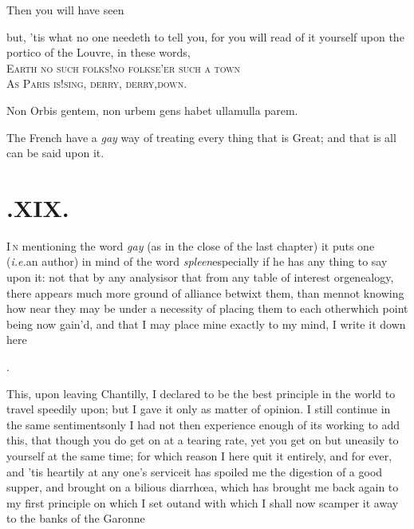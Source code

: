 \documentclass{article}
\begin{document}
\tsh Then you will have seen\tsh

\tsh but, ’tis what no one needeth to tell you,
for you will read of it yourself upon the portico of the
Louvre, in these words,\\[3pt]
\lower-3pt\hbox{\ast} \textsc{Earth no such folks!\tsk no folks\bnq\quad e’er such a
town}\\[2pt]
\textsc{As Paris is!\tsk sing, derry, derry,\bnq\quad down}.

\bgroup\footnotesize
\noindent\lower-3pt\hbox{\ast} Non Orbis gentem, non urbem gens habet
ullam\bnq\qquad\tsh\tsh\tsh\tsh ulla parem.
\par\egroup
\etp{}
\newpage
\noindent
The French have a \textit{gay} way of treating every thing
that is Great; and that is all can be said upon it.



\section{.\enspace XIX.}

\lettrine{I}{\,n} mentioning the word \textit{gay} (as
in the close of the last chapter) it puts one (\textit{i.e.}\@ an
author) in mind of the word \textit{spleen}\tsh especially
if he has any thing to say upon it: not that by any
analysis\break\tsk or that from any table of interest or\break genealogy,
there appears much more ground of alliance betwixt them, than
\break
men\tsk not knowing how near they may be
under a necessity of placing them to each other\tsh which
point being now gain’d, and that I may place mine exactly to
my mind, I write it down here\tsh

\bigskip
\centerline{.}

This, upon leaving Chantilly, I declared to be the best principle in the world to
travel speedily upon; but I gave it only as matter of opinion. I still continue in
the same sentiments\tsk\break only I had not then experience enough of its working to add
this, that though you do get on at a tearing rate, yet you get on but uneasily to
yourself at the same time; for which reason I here quit it entirely, and for ever,
and ’tis heartily at any one’s service\tsk it has spoiled me the digestion of a good
supper, and brought on a bilious diarrhœa, which has brought me back again to my
first principle on which I set out\tsh and with which I shall now scamper it away to
the banks of the Garonne\tsk
\end{document}
